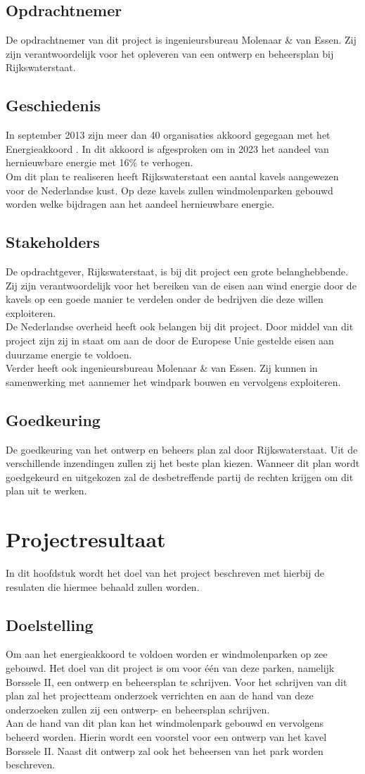 \documentclass[numbers=endperiod]{scrartcl}
\newcommand{\sectionSmall}[1]{
	\vspace{-10pt}
	\section{#1}
	\vspace{-5pt}
}
\newcommand{\whitespace}{\vspace*{2 mm} \\}%
\begin{document}
	\subsection{Opdrachtnemer}
	De opdrachtnemer van dit project is ingenieursbureau Molenaar \& van Essen. Zij zijn verantwoordelijk voor het opleveren van een ontwerp en beheersplan bij Rijkswaterstaat.
	\subsection{Geschiedenis}
	In september 2013 zijn meer dan 40 organisaties akkoord gegegaan met het Energieakkoord \cite{SER:2013:Online}. In dit akkoord is afgesproken om in 2023 het aandeel van hernieuwbare energie met 16\% te verhogen.
	\whitespace
	Om dit plan te realiseren heeft Rijkswaterstaat een aantal kavels aangewezen voor de Nederlandse kust. Op deze kavels zullen windmolenparken gebouwd worden welke bijdragen aan het aandeel hernieuwbare energie.
	\subsection{Stakeholders}
	De opdrachtgever, Rijkswaterstaat, is bij dit project een grote belanghebbende. Zij zijn verantwoordelijk voor het bereiken van de eisen aan wind energie door de kavels op een goede manier te verdelen onder de bedrijven die deze willen exploiteren.
	\whitespace
	De Nederlandse overheid heeft ook belangen bij dit project. Door middel van dit project zijn zij in staat om aan de door de Europese Unie gestelde eisen aan duurzame energie te voldoen.
	\whitespace
	Verder heeft ook ingenieursbureau Molenaar \& van Essen. Zij kunnen in samenwerking met aannemer het windpark bouwen en vervolgens exploiteren.
	\subsection{Goedkeuring}
	De goedkeuring van het ontwerp en beheers plan zal door Rijkswaterstaat. Uit de verschillende inzendingen zullen zij het beste plan kiezen. Wanneer dit plan wordt goedgekeurd en uitgekozen zal de desbetreffende partij de rechten krijgen om dit plan uit te werken.
	\newpage
	
	\sectionSmall{Projectresultaat}
	In dit hoofdstuk wordt het doel van het project beschreven met hierbij de resulaten die hiermee behaald zullen worden.
	
	\subsection{Doelstelling}
	Om aan het energieakkoord te voldoen worden er windmolenparken op zee gebouwd. Het doel van dit project is om voor één van deze parken, namelijk Borssele II, een ontwerp en beheersplan te schrijven. Voor het schrijven van dit plan zal het projectteam onderzoek verrichten en aan de hand van deze onderzoeken zullen zij een ontwerp- en beheersplan schrijven.
	\whitespace
	Aan de hand van dit plan kan het windmolenpark gebouwd en vervolgens beheerd worden. Hierin wordt een voorstel voor een ontwerp van het kavel Borssele II. Naast dit ontwerp zal ook het beheersen van het park worden beschreven.
	
\end{document}
